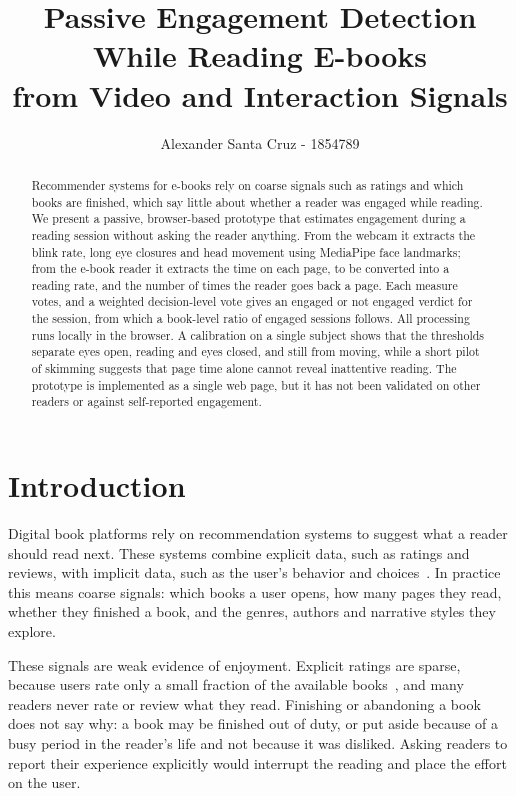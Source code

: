 \documentclass[sigconf,nonacm]{acmart}
\begin{document}
\title{Passive Engagement Detection While Reading E-books\\ from Video and Interaction Signals}

\author{Alexander Santa Cruz - 1854789}

\begin{abstract}
Recommender systems for e-books rely on coarse signals such as ratings and which books are finished, which say little about
whether a reader was engaged while reading. We present a passive, browser-based prototype that estimates engagement
during a reading session without asking the reader anything. From the webcam it extracts the blink rate, long eye closures
and head movement using MediaPipe face landmarks; from the e-book reader it extracts the time on each page, to be converted into a reading rate, and the number of
times the reader goes back a page. Each measure votes, and a weighted decision-level vote gives an engaged or not engaged
verdict for the session, from which a book-level ratio of engaged sessions follows. All processing runs locally in the
browser. A calibration on a single subject shows that the thresholds separate eyes open, reading and eyes closed, and
still from moving, while a short pilot of skimming suggests that page time alone cannot reveal inattentive reading. The prototype
is implemented as a single web page, but it has not been validated on other readers or against self-reported engagement.
\end{abstract}

\maketitle

\section{Introduction}
Digital book platforms rely on recommendation systems to suggest what a reader should read next. These systems
combine explicit data, such as ratings and reviews, with implicit data, such as the user's behavior and choices~\cite{devika2024book}.
In practice this means coarse signals: which books a user opens, how many pages they read, whether they finished a book,
and the genres, authors and narrative styles they explore.

These signals are weak evidence of enjoyment. Explicit ratings are sparse, because users rate only a small fraction of the
available books~\cite{devika2024book}, and many readers never rate or review what they read. Finishing or
abandoning a book does not say why: a book may be finished out of duty, or put aside because of a busy period in the
reader's life and not because it was disliked. Asking readers to report their experience explicitly would
interrupt the reading and place the effort on the user.
\end{document}
